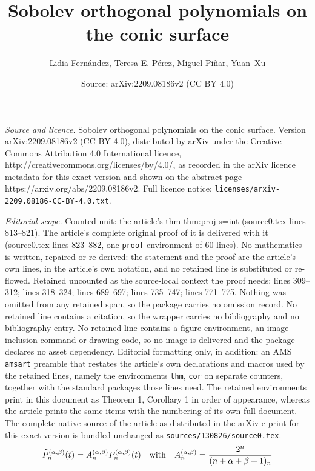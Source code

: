 \documentclass[10pt,a4paper]{amsart}
\title{Sobolev orthogonal polynomials on the conic surface}
\author{Lidia Fern\'andez, Teresa E. P\'erez, Miguel Pi\~nar, Yuan~Xu}
\date{Source: arXiv:2209.08186v2 (CC BY 4.0)}
\def\a{{\alpha}}
\def\b{{\beta}}
\newcommand{\wh}{\widehat}
\begin{document}
\maketitle

\noindent\emph{Source and licence.} Sobolev orthogonal polynomials on the conic surface. Version arXiv:2209.08186v2 (CC BY 4.0), distributed by arXiv under the Creative Commons Attribution 4.0 International licence, http://creativecommons.org/licenses/by/4.0/, as recorded in the arXiv licence metadata for this exact version and shown on the abstract page https://arxiv.org/abs/2209.08186v2. Full licence notice: \texttt{licenses/arxiv-2209.08186-CC-BY-4.0.txt}.\par\smallskip

\noindent\textit{Editorial scope.} Counted unit: the article's thm thm:proj-s=int (source0.tex lines 813--821). The article's complete original proof of it is delivered with it (source0.tex lines 823--882, one \texttt{proof} environment of 60 lines). No mathematics is written, repaired or re-derived: the statement and the proof are the article's own lines, in the article's own notation, and no retained line is substituted or re-flowed.  Retained uncounted as the source-local context the proof needs: lines 309--312; lines 318--324; lines 689--697; lines 735--747; lines 771--775.  Nothing was omitted from any retained span, so the package carries no omission record.  No retained line contains a citation, so the wrapper carries no bibliography and no bibliography entry.  No retained line contains a figure environment, an image-inclusion command or drawing code, so no image is delivered and the package declares no asset dependency.  Editorial formatting only, in addition: an AMS \texttt{amsart} preamble that restates the article's own declarations and macros used by the retained lines, namely the environments \texttt{thm}, \texttt{cor} on separate counters, together with the standard packages those lines need.  The retained environments print in this document as Theorem 1, Corollary 1 in order of appearance, whereas the article prints the same items with the numbering of its own full document.  The complete native source of the article as distributed in the arXiv e-print for this exact version is bundled unchanged as \texttt{sources/130826/source0.tex}.
\begin{equation} \label{eq:JacobiJ}
  \wh P^{(\alpha,\beta)}_{n}(t) = A_n^{(\a,\b)} {P}^{(\alpha,\beta)}_{n}(t) \quad\hbox{with}\quad
   A_n^{(\a,\b)} =  \frac{2^n}{(n+\a+\beta+1)_{n}}
\end{equation}
\end{document}
